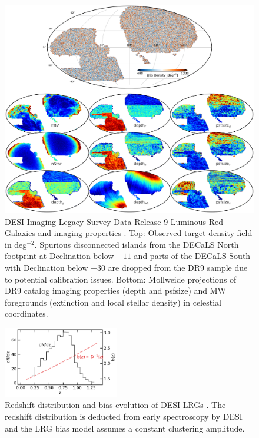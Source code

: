 \begin{figure}
    \centering
    \includegraphics[width=\textwidth]{figures/dr9data.pdf}
    \caption{DESI Imaging Legacy Survey Data Release 9 Luminous Red Galaxies and imaging properties \citep{dey2018overview}. Top: Observed target density field in deg$^{-2}$. Spurious disconnected islands from the DECaLS North footprint at Declination below $-11$ and parts of the DECaLS South with Declination below $-30$ are dropped from the DR9 sample due to potential calibration issues. Bottom: Mollweide projections of DR9 catalog imaging properties (depth and psfsize) and MW foregrounds (extinction and local stellar density) in celestial coordinates.}
    \label{fig:ng}
\end{figure}

\begin{figure}
    \centering
    \includegraphics[width=0.45\textwidth]{figures/nz_lrg.pdf}
    \caption{Redshift distribution and bias evolution of DESI LRGs \citep{zhou2021clustering, zhou2022target}. The redshift distribution is deducted from early spectroscopy by DESI and the LRG bias model assumes a constant clustering amplitude.}
    \label{fig:nz}
\end{figure}


